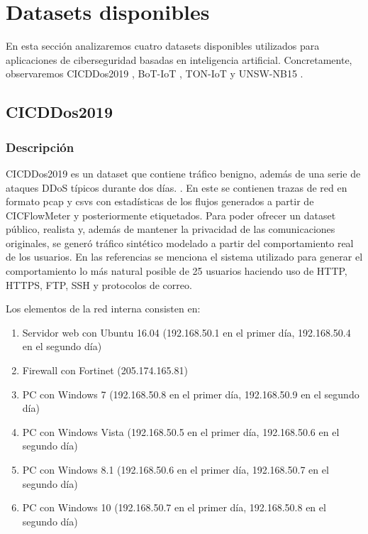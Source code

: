 \section{Datasets disponibles}

En esta sección analizaremos cuatro datasets disponibles utilizados para aplicaciones de ciberseguridad basadas en inteligencia artificial. Concretamente, observaremos CICDDos2019 \cite{8888419}, BoT-IoT \cite{DBLP:journals/corr/abs-1811-00701} \cite{10.1007/978-3-319-90775-8_3} \cite{KORONIOTIS202091} \cite{DBLP:journals/corr/abs-2005-00722} \cite{9252856} \cite{phdbotiot}, TON-IoT \cite{MOUSTAFA2021102994} \cite{9444348} \cite{9189760} \cite{9343133} \cite{9343084} \cite{moustafa2019systemic} \cite{ASHRAF2021103041} y UNSW-NB15 \cite{7348942} \cite{doi:10.1080/19393555.2015.1125974} \cite{7948715} \cite{Moustafa2017} \cite{10.1007/978-3-030-72802-1_9}.

\subsection{CICDDos2019}

\subsubsection{Descripción}

CICDDos2019 es un dataset que contiene tráfico benigno, además de una serie de ataques DDoS típicos durante dos días. \cite{cicddos2019web}. En este se contienen trazas de red en formato pcap y csvs con estadísticas de los flujos generados a partir de CICFlowMeter y posteriormente etiquetados. Para poder ofrecer un dataset público, realista y, además de mantener la privacidad de las comunicaciones originales, se generó tráfico sintético modelado a partir del comportamiento real de los usuarios. En las referencias se menciona el sistema utilizado para generar el comportamiento lo más natural posible de 25 usuarios haciendo uso de HTTP, HTTPS, FTP, SSH y protocolos de correo.

Los elementos de la red interna consisten en:

\begin{enumerate}
    \item Servidor web con Ubuntu 16.04 (192.168.50.1 en el primer día, 192.168.50.4 en el segundo día)
    \item Firewall con Fortinet (205.174.165.81)
    \item PC con Windows 7 (192.168.50.8 en el primer día, 192.168.50.9 en el segundo día)
    \item PC con Windows Vista (192.168.50.5 en el primer día, 192.168.50.6 en el segundo día)
    \item PC con Windows 8.1 (192.168.50.6 en el primer día, 192.168.50.7 en el segundo día)
    \item PC con Windows 10 (192.168.50.7 en el primer día, 192.168.50.8 en el segundo día)
\end{enumerate}

